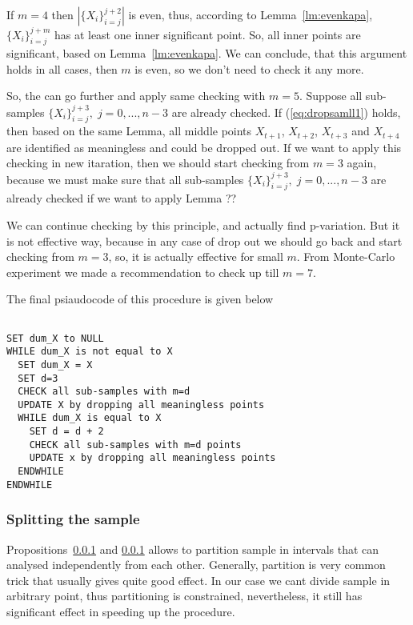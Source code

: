 \documentclass[12pt, a4paper]{article}
\numberwithin{equation}{section}
\begin{document}
If $m=4$ then $|\{X_{i}\}_{i=j}^{j+2}|$ is even, 
thus, according to Lemma~\ref{lm:evenkapa}, 
$\{X_{i}\}_{i=j}^{j+m}$ has at least one
inner significant point. So, all inner points are significant, 
based on Lemma~\ref{lm:evenkapa}. We can conclude, that 
this argument holds in all cases, then $m$ is even, so 
we don't need to check it any more.

So, the can go further and apply same checking with
$m=5$. Suppose all sub-samples
 $\{X_{i}\}_{i=j}^{j+3},\;j=0,...,n-3$ are already 
 checked.
 If (\ref{eq:dropsamll1}) holds, then based on
 the same Lemma, all middle points
$X_{t+1}$, $X_{t+2}$, $X_{t+3}$  and $X_{t+4}$ are  
identified as meaningless and could be dropped out.
If we want to apply this checking in new itaration,
then we should start checking from $m=3$ again, because
we must make sure that all sub-samples
 $\{X_{i}\}_{i=j}^{j+3},\;j=0,...,n-3$ are already 
 checked if we want to apply Lemma ??

We can continue checking by this principle, and actually find 
p-variation. But it is not effective way, because
in any case of drop out we should go back and start checking
from $m=3$, so, it is actually effective for small $m$. From Monte-Carlo experiment we made
a recommendation to check up till $m=7$.

The final psiaudocode of this procedure is given below
\begin{lstlisting}

SET dum_X to NULL
WHILE dum_X is not equal to X
  SET dum_X	= X
  SET d=3
  CHECK all sub-samples with m=d 
  UPDATE X by dropping all meaningless points
  WHILE dum_X is equal to X	
    SET d = d + 2
    CHECK all sub-samples with m=d points
    UPDATE x by dropping all meaningless points
  ENDWHILE  
ENDWHILE

\end{lstlisting}


\subsubsection{Splitting the sample}

Propositions~\ref{} and \ref{} allows to partition sample
in intervals that can analysed independently from each other.
Generally, partition is very common trick that
usually gives quite good effect. 
In our case we cant divide sample in arbitrary point, thus
partitioning is constrained, nevertheless, it still has significant 
effect in speeding up the procedure. 
\end{document}
